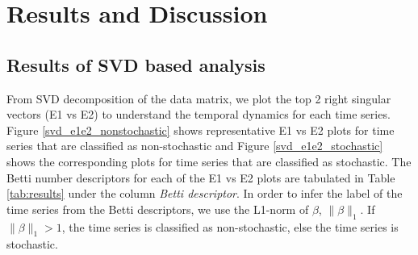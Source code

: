 \documentclass[journal]{IEEEtran}
\begin{document}
%

\section{Results and Discussion}

\subsection{Results of SVD based analysis}



From SVD decomposition of the data matrix, we plot the top 2 right singular vectors (E1 vs E2) to understand the temporal dynamics for each time series. Figure \ref{svd_e1e2_nonstochastic} shows representative E1 vs E2 plots for time series  that are classified as non-stochastic and Figure \ref{svd_e1e2_stochastic}  shows the corresponding plots for time series that are classified as stochastic. The Betti number descriptors for each of the E1 vs E2 plots are tabulated in Table \ref{tab:results} under the column \textit{Betti descriptor}. In order to infer the label of the time series from the Betti descriptors, we use the L1-norm of $\beta$, $\|\beta\|_1$. If $\|\beta\|_1 > 1$, the time series is classified as non-stochastic, else the time series is stochastic.
\end{document}

